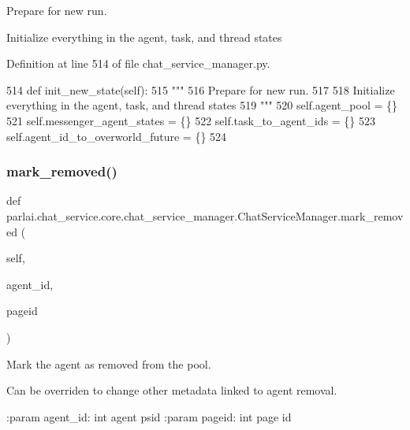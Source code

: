 \begin{DoxyVerb}Prepare for new run.

Initialize everything in the agent, task, and thread states
\end{DoxyVerb}
 

Definition at line 514 of file chat\+\_\+service\+\_\+manager.\+py.


\begin{DoxyCode}
514     \textcolor{keyword}{def }init\_new\_state(self):
515         \textcolor{stringliteral}{"""}
516 \textcolor{stringliteral}{        Prepare for new run.}
517 \textcolor{stringliteral}{}
518 \textcolor{stringliteral}{        Initialize everything in the agent, task, and thread states}
519 \textcolor{stringliteral}{        """}
520         self.agent\_pool = \{\}
521         self.messenger\_agent\_states = \{\}
522         self.task\_to\_agent\_ids = \{\}
523         self.agent\_id\_to\_overworld\_future = \{\}
524 
\end{DoxyCode}
\mbox{\label{classparlai_1_1chat__service_1_1core_1_1chat__service__manager_1_1ChatServiceManager_acd647091b75f07e2d3744b0d895c9d8c}} 
\subsubsection{\texorpdfstring{mark\+\_\+removed()}{mark\_removed()}}
{\footnotesize\ttfamily def parlai.\+chat\+\_\+service.\+core.\+chat\+\_\+service\+\_\+manager.\+Chat\+Service\+Manager.\+mark\+\_\+removed (\begin{DoxyParamCaption}\item[{}]{self,  }\item[{}]{agent\+\_\+id,  }\item[{}]{pageid }\end{DoxyParamCaption})}

\begin{DoxyVerb}Mark the agent as removed from the pool.

Can be overriden to change other metadata linked to agent removal.

:param agent_id:
    int agent psid
:param pageid:
    int page id
\end{DoxyVerb}
 

